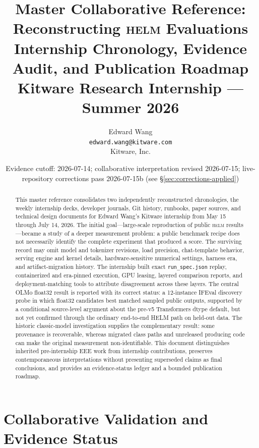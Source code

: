 \documentclass[11pt]{report}
\title{\bfseries Master Collaborative Reference: Reconstructing \textsc{helm} Evaluations\\[4pt]
  \large Internship Chronology, Evidence Audit, and Publication Roadmap\\[10pt]
  \normalsize Kitware Research Internship --- Summer 2026}
\author{Edward Wang\\ \texttt{edward.wang@kitware.com}\\[4pt]
  \small Kitware, Inc.}
\date{Evidence cutoff: 2026-07-14; collaborative interpretation revised 2026-07-15;
  live-repository corrections pass 2026-07-15b (see \S\ref{sec:corrections-applied})}
\newcommand{\file}[1]{\texttt{#1}}
\begin{document}
\maketitle

\begin{abstract}
\noindent
This master reference consolidates two independently reconstructed chronologies,
the weekly internship decks, developer journals, Git history, runbooks, paper
sources, and technical design documents for Edward Wang's Kitware internship from
May 15 through July 14, 2026. The initial goal---large-scale reproduction of public
\textsc{helm} results---became a study of a deeper measurement problem: a public
benchmark recipe does not necessarily identify the complete experiment that
produced a score. The surviving record may omit model and tokenizer revisions,
load precision, chat-template behavior, serving engine and kernel details,
hardware-sensitive numerical settings, harness era, and artifact-migration history.
The internship built exact \file{run\_spec.json} replay, containerized and era-pinned
execution, GPU leasing, layered comparison reports, and deployment-matching tools to
attribute disagreement across these layers. The central OLMo float32 result is
reported with its correct status: a 12-instance IFEval discovery probe in which
float32 candidates best matched sampled public outputs, supported by a conditional
source-level argument about the pre-v5 Transformers dtype default, but not yet
confirmed through the ordinary end-to-end HELM path on held-out data. The historic
classic-model investigation supplies the complementary result: some provenance is
recoverable, whereas migrated class paths and unreleased producing code can make the
original measurement non-identifiable. This document distinguishes inherited
pre-internship EEE work from internship contributions, preserves contemporaneous
interpretations without presenting superseded claims as final conclusions, and
provides an evidence-status ledger and a bounded publication roadmap.
\end{abstract}

\tableofcontents
\chapter{Collaborative Validation and Evidence Status}
\label{chap:collaborative-validation}
\end{document}
